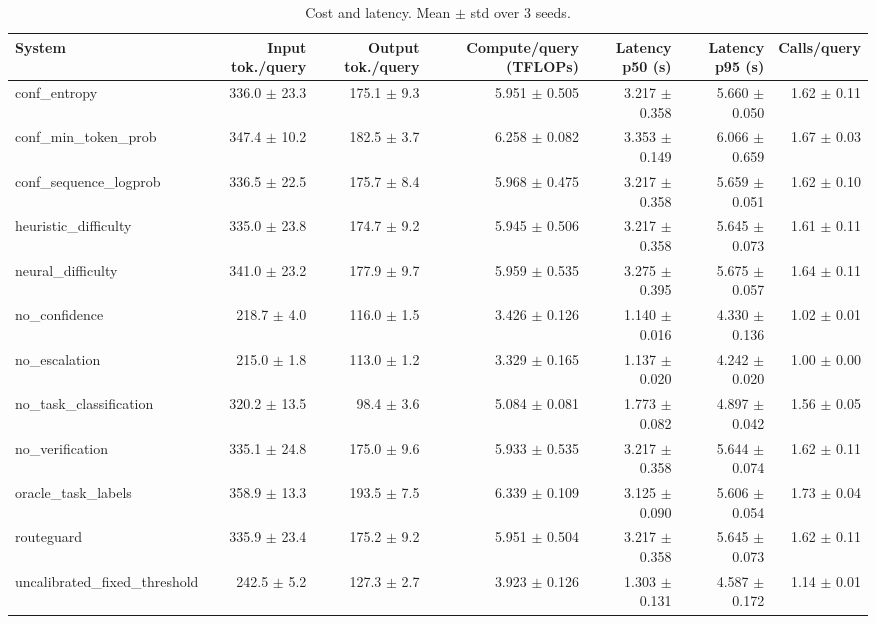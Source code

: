 \begin{table}[t]
\centering
\small
\caption{Cost and latency. Mean $\pm$ std over 3 seeds.}
\label{tab:efficiency}
\begin{tabular}{lrrrrrr}
\toprule
System & Input tok./query & Output tok./query & Compute/query (TFLOPs) & Latency p50 (s) & Latency p95 (s) & Calls/query \\
\midrule
conf\_entropy & 336.0 $\pm$ 23.3 & 175.1 $\pm$ 9.3 & 5.951 $\pm$ 0.505 & 3.217 $\pm$ 0.358 & 5.660 $\pm$ 0.050 & 1.62 $\pm$ 0.11 \\
conf\_min\_token\_prob & 347.4 $\pm$ 10.2 & 182.5 $\pm$ 3.7 & 6.258 $\pm$ 0.082 & 3.353 $\pm$ 0.149 & 6.066 $\pm$ 0.659 & 1.67 $\pm$ 0.03 \\
conf\_sequence\_logprob & 336.5 $\pm$ 22.5 & 175.7 $\pm$ 8.4 & 5.968 $\pm$ 0.475 & 3.217 $\pm$ 0.358 & 5.659 $\pm$ 0.051 & 1.62 $\pm$ 0.10 \\
heuristic\_difficulty & 335.0 $\pm$ 23.8 & 174.7 $\pm$ 9.2 & 5.945 $\pm$ 0.506 & 3.217 $\pm$ 0.358 & 5.645 $\pm$ 0.073 & 1.61 $\pm$ 0.11 \\
neural\_difficulty & 341.0 $\pm$ 23.2 & 177.9 $\pm$ 9.7 & 5.959 $\pm$ 0.535 & 3.275 $\pm$ 0.395 & 5.675 $\pm$ 0.057 & 1.64 $\pm$ 0.11 \\
no\_confidence & 218.7 $\pm$ 4.0 & 116.0 $\pm$ 1.5 & 3.426 $\pm$ 0.126 & 1.140 $\pm$ 0.016 & 4.330 $\pm$ 0.136 & 1.02 $\pm$ 0.01 \\
no\_escalation & 215.0 $\pm$ 1.8 & 113.0 $\pm$ 1.2 & 3.329 $\pm$ 0.165 & 1.137 $\pm$ 0.020 & 4.242 $\pm$ 0.020 & 1.00 $\pm$ 0.00 \\
no\_task\_classification & 320.2 $\pm$ 13.5 & 98.4 $\pm$ 3.6 & 5.084 $\pm$ 0.081 & 1.773 $\pm$ 0.082 & 4.897 $\pm$ 0.042 & 1.56 $\pm$ 0.05 \\
no\_verification & 335.1 $\pm$ 24.8 & 175.0 $\pm$ 9.6 & 5.933 $\pm$ 0.535 & 3.217 $\pm$ 0.358 & 5.644 $\pm$ 0.074 & 1.62 $\pm$ 0.11 \\
oracle\_task\_labels & 358.9 $\pm$ 13.3 & 193.5 $\pm$ 7.5 & 6.339 $\pm$ 0.109 & 3.125 $\pm$ 0.090 & 5.606 $\pm$ 0.054 & 1.73 $\pm$ 0.04 \\
routeguard & 335.9 $\pm$ 23.4 & 175.2 $\pm$ 9.2 & 5.951 $\pm$ 0.504 & 3.217 $\pm$ 0.358 & 5.645 $\pm$ 0.073 & 1.62 $\pm$ 0.11 \\
uncalibrated\_fixed\_threshold & 242.5 $\pm$ 5.2 & 127.3 $\pm$ 2.7 & 3.923 $\pm$ 0.126 & 1.303 $\pm$ 0.131 & 4.587 $\pm$ 0.172 & 1.14 $\pm$ 0.01 \\
\bottomrule
\end{tabular}
\end{table}
